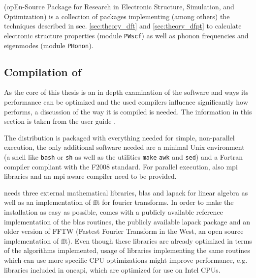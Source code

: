\documentclass[main.tex]{subfiles}
\begin{document}
\section{\QE}\label{sec:qe}

\QE (opEn-Source Package for Research in Electronic Structure, Simulation, and Optimization) \cite{giannozzi_quantum_2009,giannozzi_advanced_2017} is a collection of packages implementing (among others) the techniques described in sec. \ref{sec:theory_dft} and \ref{sec:theory_dfpt} to calculate electronic structure properties (module \texttt{PWscf}) as well as phonon frequencies and eigenmodes (module \texttt{PHonon}).

\subsection{Compilation of \QE}\label{sub:qe_compilation}

As the core of this thesis is an in depth examination of the \QE software and ways its performance can be optimized and the used compilers influence significantly how \QE performs, a discussion of the way it is compiled is needed.
The information in this section is taken from the  user guide \cite{noauthor_quantum_nodate}.

The \QE distribution is packaged with everything needed for simple, non-parallel execution, the only additional software needed are a minimal Unix environment (a shell like \texttt{bash} or \texttt{sh} as well as the utilities \texttt{make} \texttt{awk} and \texttt{sed}) and a Fortran compiler compliant with the F2008 standard.
For parallel execution, also \gls{mpi} libraries and an \gls{mpi} aware compiler need to be provided.

\QE needs three external mathematical libraries, \gls{blas} and \gls{lapack} for linear algebra as well as an implementation of \gls{fft} for fourier transforms.
In order to make the installation as easy as possible, \QE comes with a publicly available reference implementation of the \gls{blas} routines, the publicly available \gls{lapack} package and an older version of FFTW (Fastest Fourier Transform in the West, an open source implementation of \gls{fft}).
Even though these libraries are already optimized in terms of the algorithms implemented, usage of libraries implementing the same routines which can use more specific CPU optimizations might improve performance, e.g. libraries included in \gls{oneapi}, which are optimized for use on Intel CPUs.
\end{document}
